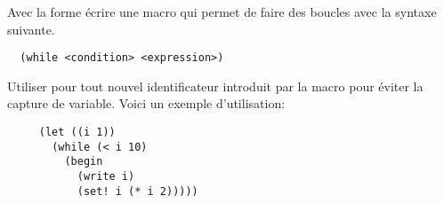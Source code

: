 \begin{Exercise}
  \label{ex:macro_while}
Avec la forme  écrire une macro qui permet de faire des
boucles  avec la syntaxe suivante.

\begin{verbatim}
  (while <condition> <expression>)
\end{verbatim}

Utiliser  pour tout nouvel identificateur introduit par la
macro pour éviter la capture de variable.  Voici un exemple
d'utilisation:

\begin{verbatim}
     (let ((i 1))
       (while (< i 10)
         (begin
           (write i)
           (set! i (* i 2)))))
\end{verbatim}
\end{Exercise}


\begin{Answer}[ref={ex:macro_while}]
\end{Answer}